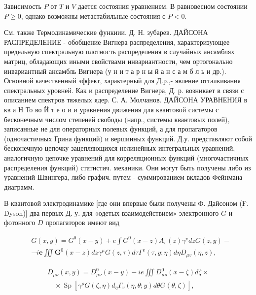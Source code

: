 \documentclass[10pt]{article}
\begin{document}
Зависимость $P$ от $T$ и $V$ дается состояния уравнением. В равновесном состоянии $P \geqslant 0$, однако возможны метастабильные состояния с $P<0$.



См. также Термодинамические функиии. Д. Н. зубарев. ДАЙСОНА РАСПРЕДЕЛЕНИЕ - обобщение Вигнера распределения, характеризующее предельную спектральную плотность распределения в случайных ансамблях матриц, обладающих иными свойствами инвариантности, чем ортогонально инвариантный ансамбль Вигнера (у н и т а р н ы й а н с а м б л ь и др.). Основной качественный эффект, характерный для Д.р.,- явление отталкивания спектральных уровней. Как и распределение Вигнера, Д. р. возникает в связи с описанием спектров тяжелых ядер. С. А. Молчанов. ДАЙСОНА УРАВНЕНИЯ в кв а Н То во Й т е о и и уравнения движения для квантовой системы с бесконечным числом степеней свободы (напр., системы квантовых полей), записанные не для операторных полевых функций, а для пропагаторов (одночастичных Грина функций) и вершинных функций. Д.у. представляют собой бесконечную цепочку зацепляющихся нелинейных интегральных уравнений, аналогичную цепочке уравнений для корреляционных функций (многочастичных распределения функций) статистич. механики. Они могут быть получены либо из уравнений Швингера, либо графич. путем - суммированием вкладов Фейнмана диаграмм.



В квантовой электродинамике [где они впервые были получены Ф. Дайсоном (F. Dyson)] два первых Д. у. для «одетых взаимодействием» электронного $G$ и фотонного $D$ пропагаторов имеют вид



\[

\begin{aligned}

& G(x, y)=G^{0}(x-y)+e \int G^{0}(x-z) A_{v}(z) \gamma^{v} d z G(z, y)- \\

& -i \boldsymbol{e} \iiint \boldsymbol{G}^{0}(x-z) d z \gamma^{\mu} G(z, \tau) d \tau \Gamma^{v}(\tau, y ; \eta) d \eta D_{\mu v}(\eta, z),

\end{aligned}

\]



\[

\begin{gathered}

D_{\mu \nu}(x, y)=D_{\mu \nu}^{0}(x-y)-i e \iiint D_{\mu \rho}^{0}(x-\zeta) d \zeta \times \\

\quad \times \operatorname{Sp}\left[\gamma^{\rho} G(\zeta, \eta) d_{\eta} \Gamma_{v}(\eta, \theta ; y) d \theta G(\theta, \zeta)\right],

\end{gathered}

\]
\end{document}

